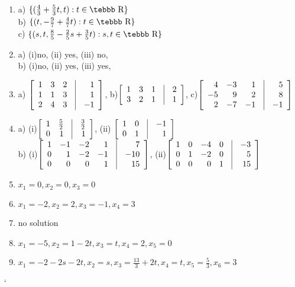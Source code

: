 \begin{enumerate}
\item
a) $\{(\frac{4}{3}+\frac{5}{3}t,t): t \in {\mbox{\tebbb R}}\}$\\
b) $\{(t,-\frac{9}{7}+\frac{4}{7}t): t \in {\mbox{\tebbb R}}\}$\\
c)  $\{(s, t,\frac{8}{5}-\frac{2}{5}s+\frac{3}{5}t): s,t \in {\mbox{\tebbb R}}\}$
\item
a) (i)no, (ii) yes, (iii) no,\\
b) (i)no, (ii) yes, (iii) yes,\\

\item a) $\left [\begin {array}{rrrrr} 1&3&2&\vline&1 \\ 1&1&3&\vline&1\\ 2&4&3&
\vline&-1  \end {array}\right ]$, b)$\left [\begin {array}{rrrrr} 1&3&1&\vline&2 \\3&2&1&
\vline&1\end {array}\right ]$, c)$\left [\begin {array}{rrrrr} 4&-3&1&\vline&5 \\-5&9&2&
\vline&8 \\ 2&-7&-1&\vline&-1\end {array}\right ]$
\item a) (i)$\left [\begin {array}{rrrr} 1&\frac{5}{2}&\vline&\frac{3}{2}\\0&1&\vline&1
\end {array}\right ]$, \quad (ii) $\left [\begin {array}{rrrr} 1&0&\vline&-1\\0&1&\vline&1\end {array}
\right ]$\\

b) (i)$\left [\begin {array}{rrrrrr} 1&-1&-2&1&\vline&7\\0&1&-2&-1&
\vline&-10\\0&0&0&1&\vline&15\end {array}\right ]$, \quad
(ii)$\left [\begin {array}{rrrrrr} 1&0&-4&0&\vline&-3\\0&1&-2&0&\vline&5
\\0&0&0&1&\vline&15\end {array}\right ]$

\item $x_1=0, x_2=0, x_3=0$
\item $x_1=-2,x_2=2,x_3=-1,x_4=3$
\item  no solution
\item $x_1=-5,x_2=1-2t,x_3=t,x_4=2,x_5=0$
\item
$x_1=-2-2s-2t,x_2=s,x_3=\frac{13}{3}+2t,x_4=t,x_5=\frac{5}{3},
x_6=3$

\end{enumerate}
\fi

%
` 